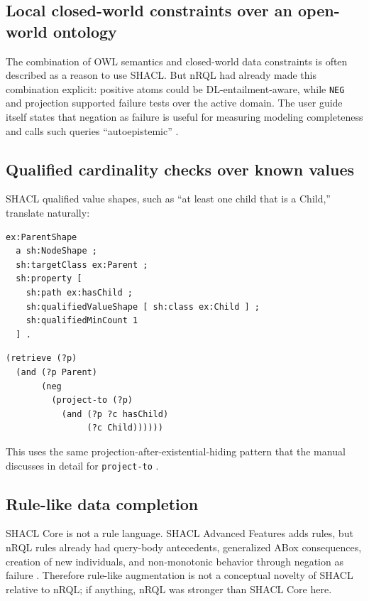 \documentclass[11pt,letterpaper]{article}
\newcommand{\nrql}{nRQL}
\newcommand{\shacl}{SHACL}
\newcommand{\naf}{negation as failure}
\newcommand{\abox}{ABox}
\newcommand{\owl}{OWL}
\begin{document}
\subsection{Local closed-world constraints over an open-world ontology}

The combination of \owl{} semantics and closed-world data constraints is often described as a reason to use \shacl{}. But \nrql{} had already made this combination explicit: positive atoms could be DL-entailment-aware, while \texttt{NEG} and projection supported failure tests over the active domain. The user guide itself states that \naf{} is useful for measuring modeling completeness and calls such queries ``autoepistemic'' \cite[p.~82]{racerug}.

\subsection{Qualified cardinality checks over known values}

\shacl{} qualified value shapes, such as ``at least one child that is a Child,'' translate naturally:

\begin{lstlisting}[language=turtle]
ex:ParentShape
  a sh:NodeShape ;
  sh:targetClass ex:Parent ;
  sh:property [
    sh:path ex:hasChild ;
    sh:qualifiedValueShape [ sh:class ex:Child ] ;
    sh:qualifiedMinCount 1
  ] .
\end{lstlisting}

\begin{lstlisting}[language=nrql]
(retrieve (?p)
  (and (?p Parent)
       (neg
         (project-to (?p)
           (and (?p ?c hasChild)
                (?c Child))))))
\end{lstlisting}

This uses the same projection-after-existential-hiding pattern that the manual discusses in detail for \texttt{project-to} \cite[pp.~119--120]{racerug}.

\subsection{Rule-like data completion}

\shacl{} Core is not a rule language. \shacl{} Advanced Features adds rules, but \nrql{} rules already had query-body antecedents, generalized \abox{} consequences, creation of new individuals, and non-monotonic behavior through \naf{} \cite[pp.~125--127]{racerug}. Therefore rule-like augmentation is not a conceptual novelty of \shacl{} relative to \nrql{}; if anything, \nrql{} was stronger than \shacl{} Core here.
\end{document}
